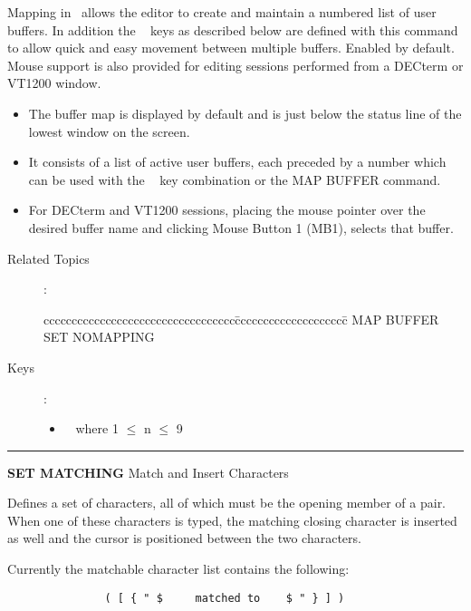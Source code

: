 \medskip
  Mapping in \STEve\ allows the editor to create and maintain a numbered
  list of user buffers. In addition the \gold\  keys as
  described below are
  defined with this command to allow quick and easy movement between
  multiple buffers. Enabled by default. Mouse support is also provided for
  editing sessions performed from a DECterm or VT1200 window.
  \begin{itemize}
  \item  The buffer map is displayed by default and is just below the status
         line of the lowest window on the screen.
  \item  It consists of a list of active user buffers, each preceded
         by a number which can be used with the \gold\  key
         combination or the MAP BUFFER command.
  \item  For DECterm and VT1200 sessions, placing the mouse pointer over
         the desired buffer name and clicking Mouse Button 1 (MB1), selects
         that buffer.
  \end{itemize}

\begin{description}
\item[Related Topics]:
\begin{tabbing}
cccccccccccccccccccccccccccccccccc\=cccccccccccccccccccc\=\kill
MAP BUFFER  \> SET NOMAPPING  \\
\end{tabbing}

\item[Keys]:
          \begin{itemize}
          \item \gold\  where 1 $\leq$ n $\leq$ 9
          \end{itemize}

\end{description}

\goodbreak

\rule{\textwidth}{0.3mm}

{\Large {\bf SET MATCHING} \hfill Match and Insert Characters}

\medskip
  Defines a set of characters, all of which must be the opening member
  of a pair. When one of these characters is typed, the matching closing
  character is inserted as well and the cursor is positioned between the
  two characters.

  Currently the matchable character list contains the following:
\begin{verbatim}
               ( [ { " $     matched to    $ " } ] )
\end{verbatim}

